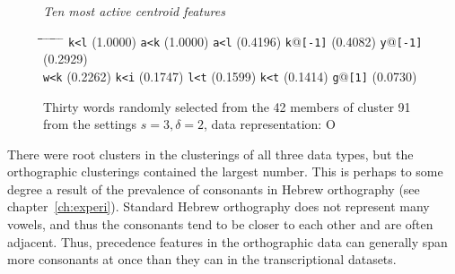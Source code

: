 \begin{figure}[!t]
\begin{mdframed}
\begin{small}
\begin{mdframed}
\textit{Ten most active centroid features}
\vspace{-4pt}
\begin{tabbing}
\hspace*{6ex}\= \hspace*{10ex}\= \hspace*{6ex}\= \hspace*{10ex} \= \hspace*{6ex} \= \hspace*{10ex} \= \hspace*{6ex}\= \hspace*{10ex} \= \hspace*{6ex} \= \hspace*{10ex}\kill
\texttt{k<l} \> (1.0000) \> \texttt{a<k} \> (1.0000) \> \texttt{a<l} \> (0.4196) \> \texttt{k}@\texttt{[-1]} \> (0.4082) \> \texttt{y}@\texttt{[-1]} \> (0.2929)\\
\texttt{w<k} \> (0.2262) \> \texttt{k<i} \> (0.1747) \> \texttt{l<t} \> (0.1599) \> \texttt{k<t} \> (0.1414) \> \texttt{g}@\texttt{[1]} \> (0.0730)
\end{tabbing}
\end{mdframed}
\end{small}
\vspace{-5pt}
\caption{Thirty words randomly selected from the 42 members of cluster 91 from the settings $s=3,\delta =2$, data representation: O}
\label{fig:cluster-91-3-2-O}
\end{mdframed}
\end{figure}

There were root clusters
 in the clusterings of all three data types, but the
orthographic clusterings contained the largest number. This is perhaps to some degree a result
of the prevalence of consonants in Hebrew orthography (see chapter~\ref{ch:experi}).
Standard Hebrew orthography does not represent many vowels, and thus the consonants tend to be closer to each other 
and are often adjacent. Thus, precedence features in the orthographic data can generally 
span more consonants at once than they can in the transcriptional datasets. 

